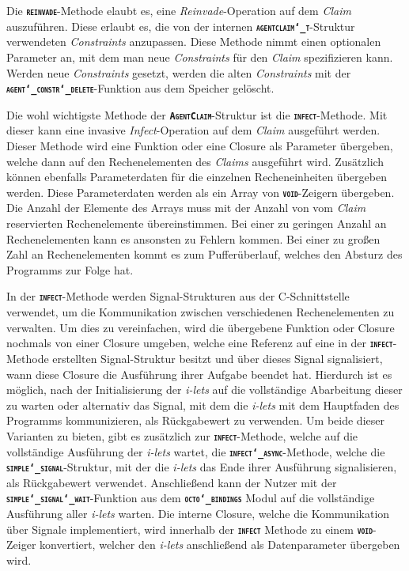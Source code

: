 Die \texttt{\textsc{\textbf{reinvade}}}-Methode elaubt es, eine \textit{Reinvade}-Operation auf dem
\textit{Claim} auszuführen. Diese erlaubt es, die von der internen
\texttt{\textsc{\textbf{agentclaim\char`_t}}}-Struktur verwendeten \textit{Constraints} anzupassen.
Diese Methode nimmt einen optionalen Parameter an,
mit dem man neue \textit{Constraints} für den \textit{Claim} spezifizieren kann.
Werden neue \textit{Constraints} gesetzt, werden die alten \textit{Constraints} mit der
\texttt{\textsc{\textbf{agent\char`_constr\char`_delete}}}-Funktion aus dem Speicher gelöscht. 

Die wohl wichtigste Methode der \texttt{\textsc{\textbf{AgentClaim}}}-Struktur ist die
\texttt{\textsc{\textbf{infect}}}-Methode. Mit dieser kann eine invasive \textit{Infect}-Operation
auf dem \textit{Claim} ausgeführt werden.
Dieser Methode wird eine Funktion oder eine Closure als Parameter übergeben,
welche dann auf den Rechenelementen des \textit{Claims} ausgeführt wird.
Zusätzlich können ebenfalls Parameterdaten für die einzelnen Recheneinheiten übergeben werden.
Diese Parameterdaten werden als ein Array von \texttt{\textsc{\textbf{void}}}-Zeigern übergeben.
Die Anzahl der Elemente des Arrays muss mit der Anzahl von vom \textit{Claim} reservierten Rechenelemente 
übereinstimmen. Bei einer zu geringen Anzahl an Rechenelementen kann es ansonsten zu Fehlern kommen.
Bei einer zu großen Zahl an Rechenelementen kommt es zum Pufferüberlauf, welches den Absturz des Programms zur
Folge hat.

In der \texttt{\textsc{\textbf{infect}}}-Methode werden Signal-Strukturen aus der C-Schnittstelle verwendet,
um die Kommunikation zwischen verschiedenen Rechenelementen zu verwalten.
Um dies zu vereinfachen, wird die übergebene Funktion oder Closure nochmals von einer Closure umgeben,
welche eine Referenz auf eine in der \texttt{\textsc{\textbf{infect}}}-Methode erstellten Signal-Struktur besitzt
und über dieses Signal signalisiert, wann diese Closure die Ausführung ihrer Aufgabe beendet hat.
Hierdurch ist es möglich, nach der Initialisierung der \textit{i-lets} auf die
vollständige Abarbeitung dieser zu warten oder alternativ das Signal, mit dem die \textit{i-lets} mit dem
Hauptfaden des Programms kommunizieren, als Rückgabewert zu verwenden.
Um beide dieser Varianten zu bieten, gibt es zusätzlich zur \texttt{\textsc{\textbf{infect}}}-Methode,
welche auf die vollständige Ausführung der \textit{i-lets} wartet,
die \texttt{\textsc{\textbf{infect\char`_async}}}-Methode,
welche die \texttt{\textsc{\textbf{simple\char`_signal}}}-Struktur,
mit der die \textit{i-lets} das Ende ihrer Ausführung signalisieren,
als Rückgabewert verwendet. Anschließend kann der Nutzer mit der 
\texttt{\textsc{\textbf{simple\char`_signal\char`_wait}}}-Funktion aus dem
\texttt{\textsc{\textbf{octo\char`_bindings}}}
Modul auf die vollständige Ausführung aller \textit{i-lets} warten.
Die interne Closure, welche die Kommunikation über Signale implementiert, wird innerhalb der
\texttt{\textsc{\textbf{infect}}} Methode zu einem \texttt{\textsc{\textbf{void}}}-Zeiger konvertiert,
welcher den \textit{i-lets} anschließend als Datenparameter übergeben wird.

